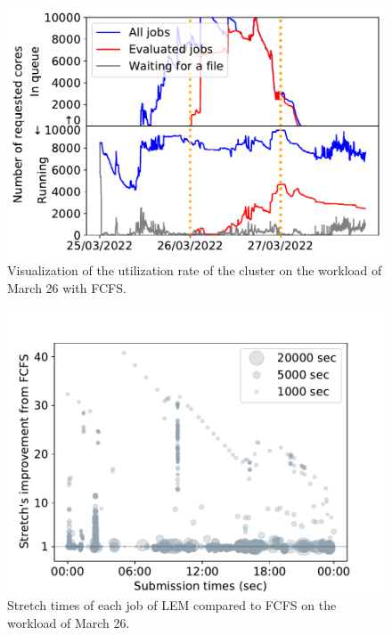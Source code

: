 \documentclass[conference,10pt]{IEEEtran}
\begin{document}
\begin{figure}[t]\centering\includegraphics[width=1\linewidth]{../MBSS/plot/Cluster_usage/2022-03-26->2022-03-26_V10000_Fcfs_Used_nodes_Reduced_450_128_32_256_4_1024_core_by_core.pdf}\caption{Visualization of the utilization rate of the cluster on the workload of March 26 with FCFS.}
\label{cluster_usage.03-26_fcfs}\end{figure}
\begin{figure}[t]\centering\includegraphics[width=1\linewidth]{../MBSS/plot/Stretch_times/Stretch_times_FCFS_LEM_2022-03-26->2022-03-26_V10000_450_128_32_256_4_1024.pdf}\caption{Stretch times of each job of LEM compared to FCFS on the workload of March 26.}
\label{vs_fcfs_lem_03-26}\end{figure}
\end{document}
